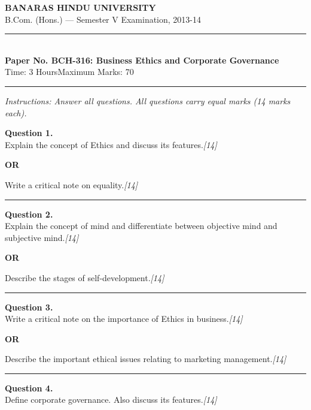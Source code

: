 \documentclass[11pt,a4paper]{article}
\newcommand{\pts}[1]{\hfill   \textit{[#1]}}
\begin{document}
\begin{center}
  {\large\bfseries BANARAS HINDU UNIVERSITY}\\[2pt]
  {\normalsize B.Com. (Hons.) --- Semester V Examination, 2013-14}\\[6pt]
  \rule{0.8\linewidth}{0.5pt}\\[6pt]
  {\large\bfseries Paper No. BCH-316: Business Ethics and Corporate Governance}\\[4pt]
  {\normalsize Time: 3 Hours\hfill Maximum Marks: 70}
\end{center}

\rule{\linewidth}{0.4pt}

\smallskip



\noindent   \textit{Instructions: Answer all questions. All questions carry equal marks (14 marks each).}

\bigskip




\noindent   \textbf{Question 1.} \\
Explain the concept of Ethics and discuss its features.\pts{14}

\centerline{   \textbf{OR}}

Write a critical note on equality.\pts{14}

\medskip\rule{\linewidth}{0.2pt}




\noindent   \textbf{Question 2.} \\
Explain the concept of mind and differentiate between objective mind and subjective mind.\pts{14}

\centerline{   \textbf{OR}}

Describe the stages of self-development.\pts{14}

\medskip\rule{\linewidth}{0.2pt}

\pagebreak




\noindent   \textbf{Question 3.} \\
Write a critical note on the importance of Ethics in business.\pts{14}

\centerline{   \textbf{OR}}

Describe the important ethical issues relating to marketing management.\pts{14}

\medskip\rule{\linewidth}{0.2pt}




\noindent   \textbf{Question 4.} \\
Define corporate governance. Also discuss its features.\pts{14}
\end{document}
